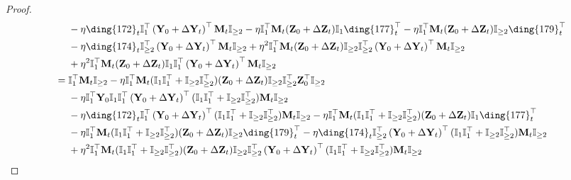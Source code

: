 \documentclass{article}
\theoremstyle{plain}
\theoremstyle{remark}
\def\bY{\mathbf{Y}}
\def\bZ{\mathbf{Z}}
\newcommand{\cc}[1]{\text{\ding{\number\numexpr#1 + 171\relax}}}
\begin{document}
\begin{proof}
\begin{align*}
        &~~~~ -\eta \cc{1}_t \mathbb{I}_{1}^\top\left(\bY_0+\Delta\bY_t\right)^\top\mathbf{M}_{t}\mathbb{I}_{\ge 2} - \eta \mathbb{I}_{1}^\top\mathbf{M}_{t}(\bZ_0+\Delta\bZ_t)\mathbb{I}_1\cc{6}_t^\top - \eta\mathbb{I}_{1}^\top\mathbf{M}_{t}(\bZ_0+\Delta\bZ_t)\mathbb{I}_{\ge 2}\cc{8}_t^\top \\
        &~~~~ -\eta \cc{3}_t \mathbb{I}_{\ge 2}^\top\left(\bY_0+\Delta\bY_t\right)^\top \mathbf{M}_{t}\mathbb{I}_{\ge 2} + \eta^2 \mathbb{I}_{1}^\top\mathbf{M}_{t}(\bZ_0+\Delta\bZ_t)\mathbb{I}_{\ge 2}\mathbb{I}_{\ge 2}^\top\left(\bY_0+\Delta\bY_t\right)^\top \mathbf{M}_{t}\mathbb{I}_{\ge 2} \\
        &~~~~ + \eta^2 \mathbb{I}_{1}^\top\mathbf{M}_{t}(\bZ_0+\Delta\bZ_t)\mathbb{I}_{1}\mathbb{I}_{1}^\top\left(\bY_0+\Delta\bY_t\right)^\top \mathbf{M}_{t}\mathbb{I}_{\ge 2}
        \\
        &=
            \mathbb{I}_{1}^\top\mathbf{M}_{t}\mathbb{I}_{\ge2}
            - \eta\mathbb{I}_{1}^\top \mathbf{M}_{t} (\mathbb{I}_{1}\mathbb{I}_{1}^\top+\mathbb{I}_{\ge 2}\mathbb{I}_{\ge 2}^\top)(\bZ_0+\Delta\bZ_t)\mathbb{I}_{\ge 2}\mathbb{I}_{\ge2}^\top \bZ_0^\top\mathbb{I}_{\ge2} 
            \\
            &~~~~ - \eta \mathbb{I}_1^\top \bY_0 \mathbb{I}_1\mathbb{I}_1^\top \left(\bY_0+\Delta\bY_t\right)^\top (\mathbb{I}_{1}\mathbb{I}_{1}^\top+\mathbb{I}_{\ge 2}\mathbb{I}_{\ge 2}^\top)\mathbf{M}_{t} \mathbb{I}_{\ge 2}  
        \\
        &~~~~ 
            -\eta \cc{1}_t \mathbb{I}_{1}^\top\left(\bY_0+\Delta\bY_t\right)^\top(\mathbb{I}_{1}\mathbb{I}_{1}^\top+\mathbb{I}_{\ge 2}\mathbb{I}_{\ge 2}^\top)\mathbf{M}_{t}\mathbb{I}_{\ge 2} 
            - \eta \mathbb{I}_{1}^\top\mathbf{M}_{t}(\mathbb{I}_{1}\mathbb{I}_{1}^\top+\mathbb{I}_{\ge 2}\mathbb{I}_{\ge 2}^\top)(\bZ_0+\Delta\bZ_t)\mathbb{I}_1\cc{6}_t^\top 
        \\
        &~~~~
            - \eta\mathbb{I}_{1}^\top\mathbf{M}_{t}(\mathbb{I}_{1}\mathbb{I}_{1}^\top+\mathbb{I}_{\ge 2}\mathbb{I}_{\ge 2}^\top)(\bZ_0+\Delta\bZ_t)\mathbb{I}_{\ge 2}\cc{8}_t^\top 
            -\eta \cc{3}_t \mathbb{I}_{\ge 2}^\top\left(\bY_0+\Delta\bY_t\right)^\top (\mathbb{I}_{1}\mathbb{I}_{1}^\top+\mathbb{I}_{\ge 2}\mathbb{I}_{\ge 2}^\top)\mathbf{M}_{t}\mathbb{I}_{\ge 2} 
        \\
        &~~~~
            + \eta^2 \mathbb{I}_{1}^\top\mathbf{M}_{t}(\mathbb{I}_{1}\mathbb{I}_{1}^\top+\mathbb{I}_{\ge 2}\mathbb{I}_{\ge 2}^\top)(\bZ_0+\Delta\bZ_t)\mathbb{I}_{\ge 2}\mathbb{I}_{\ge 2}^\top\left(\bY_0+\Delta\bY_t\right)^\top (\mathbb{I}_{1}\mathbb{I}_{1}^\top+\mathbb{I}_{\ge 2}\mathbb{I}_{\ge 2}^\top)\mathbf{M}_{t}\mathbb{I}_{\ge 2}

\end{align*}
\end{proof}
\end{document}
